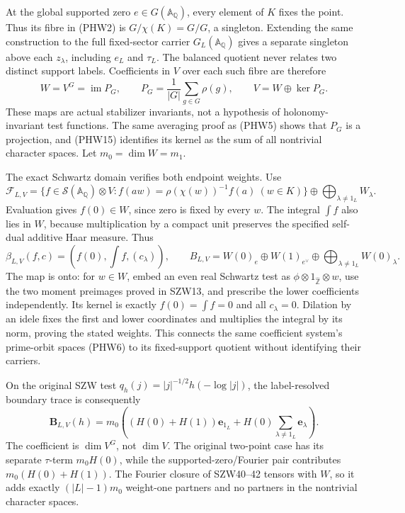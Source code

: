 \documentclass[
  10pt,
  a4paper,
]{article}
\begin{document}
At the global supported zero \(e\in G(\mathbb A_{\mathbb Q})\), every
element of \(K\) fixes the point. Thus its fibre in (PHW2) is
\(G/\chi(K)=G/G\), a singleton. Extending the same construction to the
full fixed-sector carrier \(G_L(\mathbb A_{\mathbb Q})\) gives a
separate singleton above each \(z_\lambda\), including \(e_L\) and
\(\tau_L\). The balanced quotient never relates two distinct support
labels. Coefficients in \(V\) over each such fibre are therefore \[
W=V^G=\operatorname{im}P_G,
\qquad P_G=\frac1{|G|}\sum_{g\in G}\rho(g),
\qquad V=W\oplus\ker P_G.
\tag{PHW19}
\] These maps are actual stabilizer invariants, not a hypothesis of
holonomy-invariant test functions. The same averaging proof as (PHW5)
shows that \(P_G\) is a projection, and (PHW15) identifies its kernel as
the sum of all nontrivial character spaces. Let \(m_0=\dim W=m_1\).

The exact Schwartz domain verifies both endpoint weights. Use \[
\mathcal F_{L,V}=
\{f\in\mathcal S(\mathbb A_{\mathbb Q})\otimes V:
f(aw)=\rho(\chi(w))^{-1}f(a)\ (w\in K)\}
\oplus\bigoplus_{\lambda\ne1_L}W_\lambda.
\tag{PHW20}
\] Evaluation gives \(f(0)\in W\), since zero is fixed by every \(w\).
The integral \(\int f\) also lies in \(W\), because multiplication by a
compact unit preserves the specified self-dual additive Haar measure.
Thus \[
\beta_{L,V}(f,c)=\left(f(0),\int f,(c_\lambda)\right),
\qquad
B_{L,V}=W(0)_e\oplus W(1)_{e^\vee}
\oplus\bigoplus_{\lambda\ne1_L}W(0)_\lambda.
\tag{PHW21}
\] The map is onto: for \(w\in W\), embed an even real Schwartz test as
\(\phi\otimes1_{\widehat{\mathbb Z}}\otimes w\), use the two moment
preimages proved in SZW13, and prescribe the lower coefficients
independently. Its kernel is exactly \(f(0)=\int f=0\) and all
\(c_\lambda=0\). Dilation by an idele fixes the first and lower
coordinates and multiplies the integral by its norm, proving the stated
weights. This connects the same coefficient system's prime-orbit spaces
(PHW6) to its fixed-support quotient without identifying their carriers.

On the original SZW test \(q_h(j)=|j|^{-1/2}h(-\log|j|)\), the
label-resolved boundary trace is consequently \[
\boldsymbol B_{L,V}(h)
=m_0\left((H(0)+H(1))\mathbf e_{1_L}
+H(0)\sum_{\lambda\ne1_L}\mathbf e_\lambda\right).
\tag{PHW22}
\] The coefficient is \(\dim V^G\), not \(\dim V\). The original
two-point case has its separate \(\tau\)-term \(m_0H(0)\), while the
supported-zero/Fourier pair contributes \(m_0(H(0)+H(1))\). The Fourier
closure of SZW40--42 tensors with \(W\), so it adds exactly
\((|L|-1)m_0\) weight-one partners and no partners in the nontrivial
character spaces.
\end{document}
